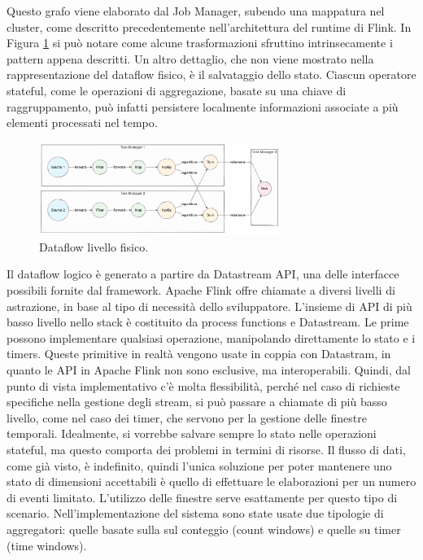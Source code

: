 Questo grafo viene elaborato dal Job Manager, subendo una mappatura nel cluster, come descritto precedentemente nell'architettura del runtime di Flink. In Figura \ref{fig:dataflow-phy} si può notare come alcune trasformazioni sfruttino intrinsecamente i pattern appena descritti. %
Un altro dettaglio, che non viene mostrato nella rappresentazione del dataflow fisico, è il salvataggio dello stato. Ciascun operatore stateful, come le operazioni di aggregazione, basate su una chiave di raggruppamento, può infatti persistere localmente informazioni associate a più elementi processati nel tempo. %


\begin{figure}[htbp]
    \centering
    \includegraphics[width=0.7\textwidth]{figures/physical-dataflow-example.png}
    \caption{Dataflow livello fisico.}
    \label{fig:dataflow-phy}
\end{figure}  


Il dataflow logico è generato a partire da Datastream API, una delle interfacce possibili fornite dal framework. Apache Flink offre chiamate a diversi livelli di astrazione, in base al tipo di necessità dello sviluppatore. L'insieme di API di più basso livello nello stack è costituito da process functions e Datastream. Le prime possono implementare qualsiasi operazione, manipolando direttamente lo stato e i timers. Queste primitive in realtà vengono usate in coppia con Datastram, in quanto le API in Apache Flink non sono esclusive, ma interoperabili. Quindi, dal punto di vista implementativo c'è molta flessibilità, perché nel caso di richieste specifiche nella gestione degli stream, si può passare a chiamate di più basso livello, come nel caso dei timer, che servono per la gestione delle finestre temporali. Idealmente, si vorrebbe salvare sempre lo stato nelle operazioni stateful, ma questo comporta dei problemi in termini di risorse. Il flusso di dati, come già visto, è indefinito, quindi l'unica soluzione per poter mantenere uno stato di dimensioni accettabili è quello di effettuare le elaborazioni per un numero di eventi limitato. L'utilizzo delle finestre serve esattamente per questo tipo di scenario. Nell'implementazione del sistema sono state usate due tipologie di aggregatori: quelle basate sulla sul conteggio (count windows) e quelle su timer (time windows). %

